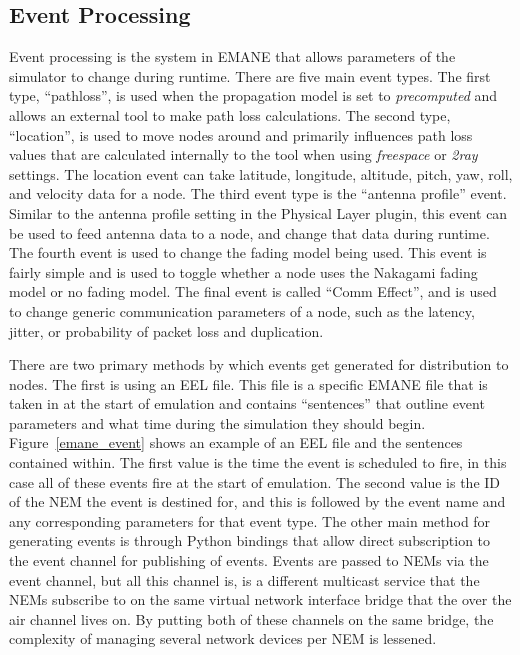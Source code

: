 \subsection{Event Processing}
Event processing is the system in EMANE that allows parameters of the simulator to change during runtime.
There are five main event types.
The first type, ``pathloss'', is used when the propagation model is set to \textit{precomputed} and allows an external tool to make path loss calculations.
The second type, ``location'', is used to move nodes around and primarily influences path loss values that are calculated internally to the tool when using \textit{freespace} or \textit{2ray} settings.
The location event can take latitude, longitude, altitude, pitch, yaw, roll, and velocity data for a node.
The third event type is the ``antenna profile'' event.
Similar to the antenna profile setting in the Physical Layer plugin, this event can be used to feed antenna data to a node, and change that data during runtime.
The fourth event is used to change the fading model being used.
This event is fairly simple and is used to toggle whether a node uses the Nakagami fading model or no fading model.
The final event is called ``Comm Effect'', and is used to change generic communication parameters of a node, such as the latency, jitter, or probability of packet loss and duplication.\par
There are two primary methods by which events get generated for distribution to nodes.
The first is using an EEL file.
This file is a specific EMANE file that is taken in at the start of emulation and contains ``sentences'' that outline event parameters and what time during the simulation they should begin.
Figure~\ref{emane_event} shows an example of an EEL file and the sentences contained within.
The first value is the time the event is scheduled to fire, in this case all of these events fire at the start of emulation.
The second value is the ID of the NEM the event is destined for, and this is followed by the event name and any corresponding parameters for that event type.
The other main method for generating events is through Python bindings that allow direct subscription to the event channel for publishing of events.
Events are passed to NEMs via the event channel, but all this channel is, is a different multicast service that the NEMs subscribe to on the same virtual network interface bridge that the over the air channel lives on.
By putting both of these channels on the same bridge, the complexity of managing several network devices per NEM is lessened.

